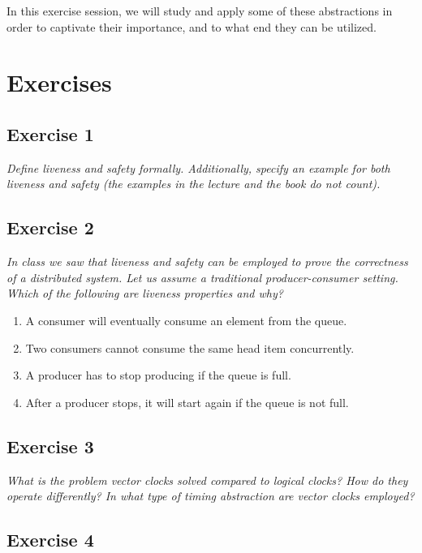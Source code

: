 In this exercise session, we will study and apply some of these abstractions in order to captivate their importance, and to what end they can be utilized.

\section{Exercises}
\label{sec:exercises}

\subsection*{Exercise 1}
\label{sec:exercise_1}

\emph{Define liveness and safety formally. Additionally, specify an example for both liveness and safety (the examples in the lecture and the book do not count).}

\subsection*{Exercise 2}
\label{sec:exercise_2}

\emph{In class we saw that liveness and safety can be employed to prove the correctness of a distributed system. Let us assume a traditional producer-consumer setting. Which of the following are liveness properties and why?}

\begin{enumerate}
\item A consumer will eventually consume an element from the queue.
\item Two consumers cannot consume the same head item concurrently.
\item A producer has to stop producing if the queue is full.
\item After a producer stops, it will start again if the queue is not full.
\end{enumerate}

\subsection*{Exercise 3}
\label{sec:exercise_3}

\emph{What is the problem vector clocks solved compared to logical clocks? How do they operate differently? In what type of timing abstraction are vector clocks employed?}

\subsection*{Exercise 4}
\label{sec:exercise_4}

